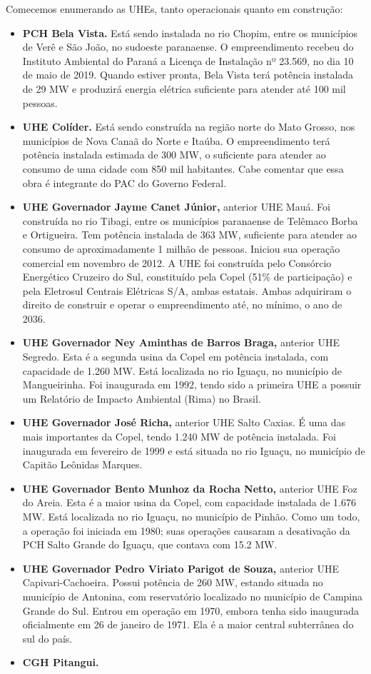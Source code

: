 \documentclass[grad,numbers]{coppe}
\providecommand{\tightlist}{%
  \setlength{\itemsep}{0pt}\setlength{\parskip}{0pt}}
\begin{document}
  Comecemos enumerando as UHEs, tanto operacionais quanto em construção:
  \begin{itemize}
  \tightlist
  \item
    \textbf{PCH Bela Vista.} Está sendo instalada no rio Chopim, entre os municípios de Verê e São João, no sudoeste paranaense. O empreendimento recebeu do Instituto Ambiental do Paraná a Licença de Instalação nº 23.569, no dia 10 de maio de 2019. Quando estiver pronta, Bela Vista terá potência instalada de 29 MW e produzirá energia elétrica suficiente para atender até 100 mil pessoas.
  \item
    \textbf{UHE Colíder.} Está sendo construída na região norte do Mato Grosso, nos municípios de Nova Canaã do Norte e Itaúba. O empreendimento terá potência instalada estimada de 300 MW, o suficiente para atender ao consumo de uma cidade com 850 mil habitantes. Cabe comentar que essa obra é integrante do PAC do Governo Federal.
  \item
    \textbf{UHE Governador Jayme Canet Júnior,} anterior UHE Mauá. Foi construída no rio Tibagi, entre os municípios paranaense de Telêmaco Borba e Ortigueira. Tem potência instalada de 363 MW, suficiente para atender ao consumo de aproximadamente 1 milhão de pessoas. Iniciou sua operação comercial em novembro de 2012. A UHE foi construída pelo Consórcio Energético Cruzeiro do Sul, constituído pela Copel (51\% de participação) e pela Eletrosul Centrais Elétricas S/A, ambas estatais. Ambas adquiriram o direito de construir e operar o empreendimento até, no mínimo, o ano de 2036.
  \item
    \textbf{UHE Governador Ney Aminthas de Barros Braga,} anterior UHE Segredo. Esta é a segunda usina da Copel em potência instalada, com capacidade de 1.260 MW. Está localizada no rio Iguaçu, no município de Mangueirinha. Foi inaugurada em 1992, tendo sido a primeira UHE a possuir um Relatório de Impacto Ambiental (Rima) no Brasil.
  \item
    \textbf{UHE Governador José Richa,} anterior UHE Salto Caxias. É uma das mais importantes da Copel, tendo 1.240 MW de potência instalada. Foi inaugurada em fevereiro de 1999 e está situada no rio Iguaçu, no município de Capitão Leônidas Marques.
  \item
    \textbf{UHE Governador Bento Munhoz da Rocha Netto,} anterior UHE Foz do Areia. Esta é a maior usina da Copel, com capacidade instalada de 1.676 MW. Está localizada no rio Iguaçu, no município de Pinhão. Como um todo, a operação foi iniciada em 1980; suas operações causaram a desativação da PCH Salto Grande do Iguaçu, que contava com 15.2 MW.
  \item
    \textbf{UHE Governador Pedro Viriato Parigot de Souza,} anterior UHE Capivari-Cachoeira. Possui potência de 260 MW, estando situada no município de Antonina, com reservatório localizado no município de Campina Grande do Sul. Entrou em operação em 1970, embora tenha sido inaugurada oficialmente em 26 de janeiro de 1971. Ela é a maior central subterrânea do sul do país.
  \item
    \textbf{CGH Pitangui.}
  \end{itemize}
\end{document}
